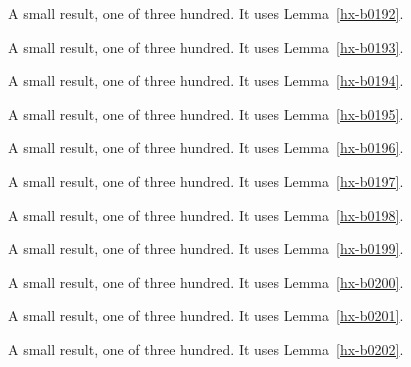\begin{lemma}[Bulk 193]\label{hx-b0193}
A small result, one of three hundred. It uses Lemma~\ref{hx-b0192}.
\end{lemma}

\begin{lemma}[Bulk 194]\label{hx-b0194}
A small result, one of three hundred. It uses Lemma~\ref{hx-b0193}.
\end{lemma}

\begin{lemma}[Bulk 195]\label{hx-b0195}
A small result, one of three hundred. It uses Lemma~\ref{hx-b0194}.
\end{lemma}

\begin{lemma}[Bulk 196]\label{hx-b0196}
A small result, one of three hundred. It uses Lemma~\ref{hx-b0195}.
\end{lemma}

\begin{lemma}[Bulk 197]\label{hx-b0197}
A small result, one of three hundred. It uses Lemma~\ref{hx-b0196}.
\end{lemma}

\begin{lemma}[Bulk 198]\label{hx-b0198}
A small result, one of three hundred. It uses Lemma~\ref{hx-b0197}.
\end{lemma}

\begin{lemma}[Bulk 199]\label{hx-b0199}
A small result, one of three hundred. It uses Lemma~\ref{hx-b0198}.
\end{lemma}

\begin{lemma}[Bulk 200]\label{hx-b0200}
A small result, one of three hundred. It uses Lemma~\ref{hx-b0199}.
\end{lemma}

\begin{lemma}[Bulk 201]\label{hx-b0201}
A small result, one of three hundred. It uses Lemma~\ref{hx-b0200}.
\end{lemma}

\begin{lemma}[Bulk 202]\label{hx-b0202}
A small result, one of three hundred. It uses Lemma~\ref{hx-b0201}.
\end{lemma}

\begin{lemma}[Bulk 203]\label{hx-b0203}
A small result, one of three hundred. It uses Lemma~\ref{hx-b0202}.
\end{lemma}

